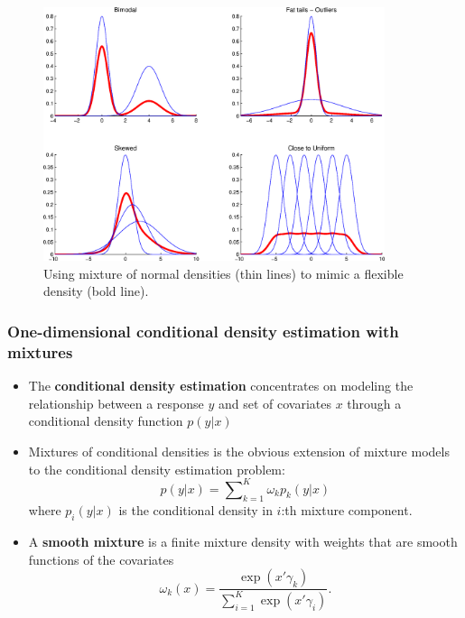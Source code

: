 \documentclass[11pt]{beamer}
\begin{document}
\begin{frame}
  \begin{figure}
    \centering
    \includegraphics[width=10cm]{MixtureOfNormals2}\caption{Using mixture of normal
      densities (thin lines) to mimic a flexible density (bold line).}
    \label{fig: mix-norm}
  \end{figure}
\end{frame}


\begin{frame}
  \frametitle{One-dimensional conditional density estimation with mixtures}

  \begin{itemize}
  \item The \textbf{conditional density estimation} concentrates on modeling the
    relationship between a response $y$ and set of covariates $x$ through a
    conditional density function $p(y|x)$

  \item Mixtures of conditional densities is the obvious extension of mixture
    models to the conditional density estimation problem:
    \[
    p(y|x)=\sum\nolimits _{k=1}^{K}\omega_{k}p_{k}(y|x)
    \]
    where $p_{i}(y|x)$ is the conditional density in $i$:th mixture component.

  \item A \textbf{smooth mixture} is a finite mixture density with weights that
    are smooth functions of the covariates
    \[
    \omega_{k}(x)=\frac{\exp(x'\gamma_{k})}{\sum_{i=1}^{K}\exp(x'\gamma_{i})}.
    \]
  \end{itemize}

\end{frame}
\end{document}
